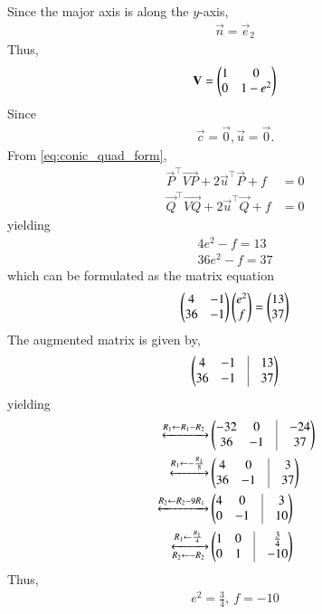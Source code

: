 Since the major axis is along the $y$-axis,
\begin{align}
\vec{n} = \vec{e}_2
\end{align}
Thus,
\begin{align}
\boldsymbol{\mathbf{V}} = \begin{pmatrix}1&0\\0&1-e^2\end{pmatrix} \label{eq:chapters/11/11/3/19/5} 
\end{align}
Since
\begin{align}
\vec{c} = \vec{0}, \vec{u}=\vec{0}.
\label{eq:chapters/11/11/3/19/8}
\end{align}
    From \eqref{eq:conic_quad_form},
    \begin{align}
        \vec{P}^\top\vec{VP} + 2\vec{u}^\top\vec{P} + f &= 0 \label{eq:chapters/11/11/3/19/ep1} \\
        \vec{Q}^\top\vec{VQ} + 2\vec{u}^\top\vec{Q} + f &= 0 \label{eq:chapters/11/11/3/19/ep2}
    \end{align}
    yielding
\begin{align}
4e^2 - f = 13 \label{eq:chapters/11/11/3/19/10}
\\
36e^2 - f = 37 \label{eq:chapters/11/11/3/19/11}
\end{align}
which can be formulated as the matrix equation
\begin{align}
\begin{pmatrix}4&-1\\36&-1\end{pmatrix}\begin{pmatrix}e^2\\f\end{pmatrix} = \begin{pmatrix}13\\37\end{pmatrix}
\label{eq:chapters/11/11/3/19/12}
\end{align}
The augmented matrix is given by,
\begin{align}
\myvec{4&-1&\vline&13\\36&-1&\vline&37}
\end{align}
yielding
\begin{align}
\xleftrightarrow[]{R_1\leftarrow R_1-R_2} &\myvec{-32&0&\vline&-24\\36&-1&\vline&37} \\
\xleftrightarrow[]{R_1\leftarrow-\frac{R_1}{8}}& \myvec{4&0&\vline&3\\36&-1&\vline&37} \\
\xleftrightarrow[]{R_2\leftarrow R_2-9R_1}
&\myvec{4&0&\vline&3\\0&-1&\vline&10} \\
\xleftrightarrow[R_2\leftarrow -R_2]{R_1\leftarrow \frac{R_1}{4}}
&\myvec{1&0&\vline&\frac{3}{4}\\0&1&\vline&-10}
\end{align}
Thus,
\begin{align}
e^2 = \frac{3}{4},\ f = -10
\end{align}
